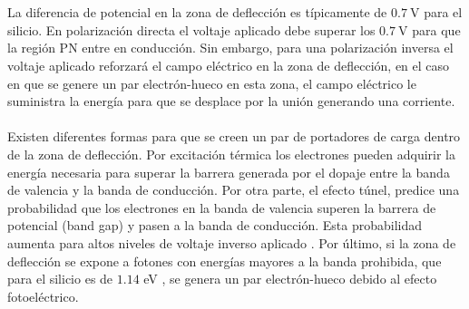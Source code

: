 \\ \\ 
La diferencia de potencial en la zona de deflección es típicamente de $0.7~$V para el silicio. En polarización directa el voltaje aplicado debe superar los  $0.7~$V para que la región PN entre en conducción. Sin embargo, para una polarización inversa el voltaje aplicado reforzará el campo eléctrico en la zona de deflección, en el caso en que se genere un par electrón-hueco en esta zona, el campo eléctrico le suministra la energía para que se desplace por la unión generando una corriente.\\ \\%
Existen diferentes formas para que se creen un par de portadores de carga dentro de  la zona de deflección. Por excitación térmica los electrones pueden adquirir la energía necesaria para superar la barrera generada por el dopaje entre la banda de valencia y la banda de conducción. Por otra parte, el efecto túnel, predice una probabilidad que los electrones en la banda de valencia superen la barrera de potencial (band gap) y pasen a la banda de conducción. Esta probabilidad aumenta para altos niveles de voltaje inverso aplicado \citep{tesis_caract_SIPM}. Por último, si la zona de deflección se expone a fotones con energías mayores a la banda prohibida, que para el silicio es de $1.14$ eV \citep{MPPC_note}, se genera un par electrón-hueco debido al efecto fotoeléctrico.\\ \\


